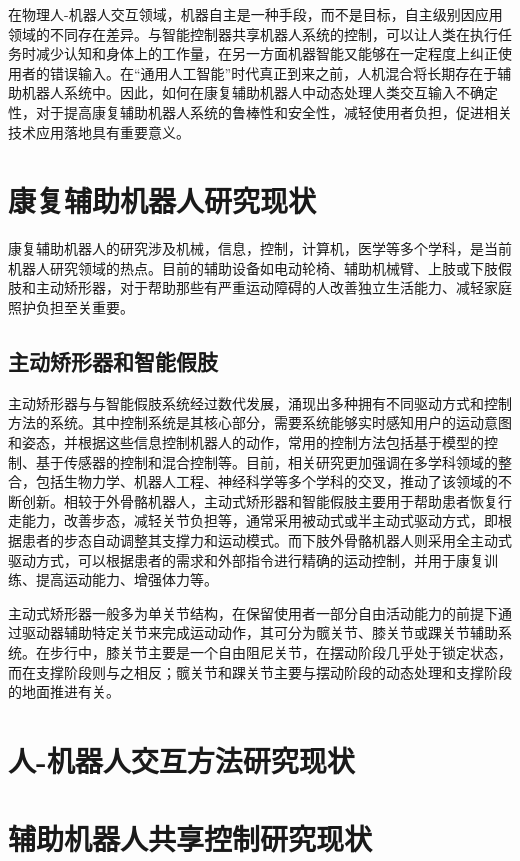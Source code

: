 在物理人-机器人交互领域，机器自主是一种手段，而不是目标，自主级别因应用领域的不同存在差异。与智能控制器共享机器人系统的控制，可以让人类在执行任务时减少认知和身体上的工作量，在另一方面机器智能又能够在一定程度上纠正使用者的错误输入。在``通用人工智能''时代真正到来之前，人机混合将长期存在于辅助机器人系统中\cite{ZhangMianXiangRenJiXuGuanJueCeDeHunHeZhiNengFangFaYanJiu2021}。因此，如何在康复辅助机器人中动态处理人类交互输入不确定性，对于提高康复辅助机器人系统的鲁棒性和安全性，减轻使用者负担，促进相关技术应用落地具有重要意义。

\section{康复辅助机器人研究现状}
康复辅助机器人的研究涉及机械，信息，控制，计算机，医学等多个学科，是当前机器人研究领域的热点。目前的辅助设备如电动轮椅、辅助机械臂、上肢或下肢假肢和主动矫形器，对于帮助那些有严重运动障碍的人改善独立生活能力、减轻家庭照护负担至关重要。
\subsection{主动矫形器和智能假肢}
主动矫形器与与智能假肢系统经过数代发展，涌现出多种拥有不同驱动方式和控制方法的系统。其中控制系统是其核心部分，需要系统能够实时感知用户的运动意图和姿态，并根据这些信息控制机器人的动作，常用的控制方法包括基于模型的控制、基于传感器的控制和混合控制等。目前，相关研究更加强调在多学科领域的整合，包括生物力学、机器人工程、神经科学等多个学科的交叉，推动了该领域的不断创新。相较于外骨骼机器人，主动式矫形器和智能假肢主要用于帮助患者恢复行走能力，改善步态，减轻关节负担等，通常采用被动式或半主动式驱动方式，即根据患者的步态自动调整其支撑力和运动模式。而下肢外骨骼机器人则采用全主动式驱动方式，可以根据患者的需求和外部指令进行精确的运动控制，并用于康复训练、提高运动能力、增强体力等。

主动式矫形器一般多为单关节结构，在保留使用者一部分自由活动能力的前提下通过驱动器辅助特定关节来完成运动动作，其可分为髋关节、膝关节或踝关节辅助系统\cite{malcolmExperimentalStudyRole2009}。在步行中，膝关节主要是一个自由阻尼关节，在摆动阶段几乎处于锁定状态，而在支撑阶段则与之相反；髋关节和踝关节主要与摆动阶段的动态处理和支撑阶段的地面推进有关。


\section{人-机器人交互方法研究现状}

\section{辅助机器人共享控制研究现状}

